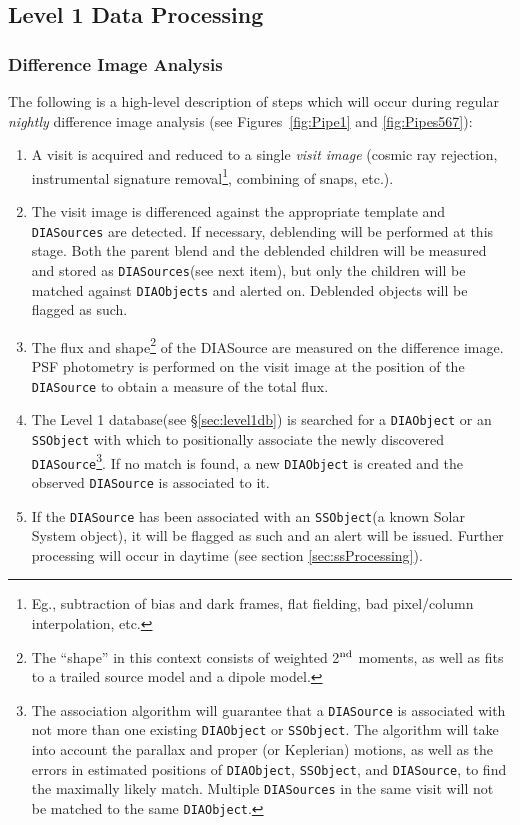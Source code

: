 \documentclass[12pt]{article}
\newcommand{\code}[1]{\texttt{#1}}
\newcommand{\DIASource}{\code{DIASource}\xspace}
\newcommand{\DIASources}{\code{DIASources}\xspace}
\newcommand{\DIAObject}{\code{DIAObject}\xspace}
\newcommand{\DIAObjects}{\code{DIAObjects}\xspace}
\newcommand{\DB}{{Level 1 database}\xspace}
\newcommand{\SSObject}{\code{SSObject}\xspace}
\begin{document}
\subsection{Level 1 Data Processing}

\subsubsection{Difference Image Analysis}
\label{sec:dia}

The following is a high-level description of steps which will occur during regular {\em nightly}
difference image analysis (see Figures~\ref{fig:Pipe1} and \ref{fig:Pipes567}):
\begin{enumerate}
\item A visit is acquired and reduced to a single {\em visit image} (cosmic ray rejection, instrumental signature removal\footnote{Eg., subtraction of bias and dark frames, flat fielding, bad pixel/column interpolation, etc.}, combining of snaps, etc.).
\item The visit image is differenced against the appropriate template and \DIASources are detected. If necessary, deblending will be performed at this stage. Both the parent blend and the deblended children will be measured and stored as \DIASources (see next item), but only the children will be matched against \DIAObjects and alerted on. Deblended objects will be flagged as such.
\item The flux and shape\footnote{The ``shape'' in this context consists of weighted 2$^{\rm nd}$ moments, as well as fits to a trailed source model and a dipole model.} of the DIASource are measured on the difference image. PSF photometry is performed on the visit image at the position of the \DIASource to obtain a measure of the total flux.
\item The \DB (see \S \ref{sec:level1db}) is searched for a \DIAObject or an \SSObject with which to positionally associate the newly discovered \DIASource\footnote{The association algorithm will guarantee that a \DIASource is associated with not more than one existing \DIAObject or \SSObject. The algorithm will take into account the parallax and proper (or Keplerian) motions, as well as the errors in estimated positions of \DIAObject, \SSObject, and \DIASource, to find the maximally likely match. Multiple \DIASources in the same visit will not be matched to the same \DIAObject.}. If no match is found, a new \DIAObject is created and the observed \DIASource is associated to it.
\item If the \DIASource has been associated with an \SSObject (a known Solar System object), it will be flagged as such and an alert will be issued. Further processing will occur in daytime (see section \ref{sec:ssProcessing}).

\end{enumerate}
\end{document}
